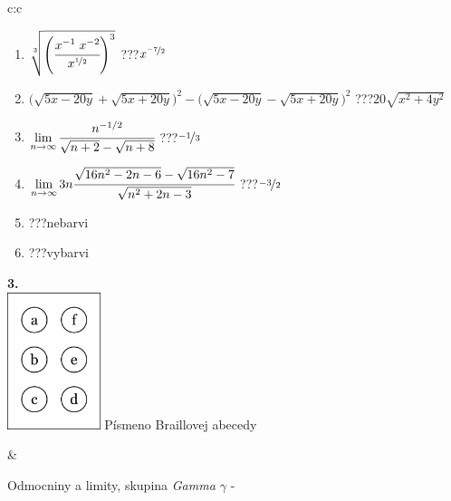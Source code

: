 \documentclass[10pt]{report}
\begin{document}
\begin{tabular}{c:c}
\begin{minipage}[c][104.5mm][t]{0.5\linewidth}
\begin{center}
\begin{minipage}{0.79\linewidth}
\begin{center}
\begin{varwidth}{\linewidth}
\begin{enumerate}
\small
\item $\sqrt[3]{\left(\cfrac{x^{-1}\;x^{-2}}{x^{\nicefrac{1}{2}}}\right)^{3}}$\quad \dotfill\; ???\;\dotfill \quad $x^{\nicefrac{-7}{2}}$
\item {\footnotesize{\scriptsize$\big(\sqrt{5x-20y}+\sqrt{5x+20y}\big)^2-\big(\sqrt{5x-20y}-\sqrt{5x+20y}\big)^2$}\quad \dotfill\; ???\;\dotfill \quad $20\sqrt{x^2+4y^2}$}
\item $\lim\limits_{n\to\infty}\cfrac{n^{-1/2}}{\sqrt{n+2}-\sqrt{n+8}}$\quad \dotfill\; ???\;\dotfill \quad $\nicefrac{-1}{3}$
\item $\lim\limits_{n\to\infty}3n\cfrac{\sqrt{16n^2-2n-6}-\sqrt{16n^2-7}}{\sqrt{n^2+2n-3}}$\quad \dotfill\; ???\;\dotfill \quad $\nicefrac{-3}{2}$
\item \quad \dotfill\; ???\;\dotfill \quad nebarvi
\item \quad \dotfill\; ???\;\dotfill \quad vybarvi
\end{enumerate}
\end{varwidth}
\end{center}
\end{minipage}
\begin{minipage}{0.20\linewidth}
\begin{center}
{\Huge\bfseries 3.} \\[2mm]
\includegraphics[height=40mm]{../images/braille.png}
{\small Písmeno Braillovej abecedy}
\end{center}
\end{minipage}
\end{center}
\end{minipage}
&
\begin{minipage}[c][104.5mm][t]{0.5\linewidth}
\begin{center}
\vspace{7mm}
{\huge Odmocniny a limity, skupina \textit{Gamma $\gamma$} -}\\[5mm]

\end{center}
\end{minipage}
\end{tabular}
\end{document}
